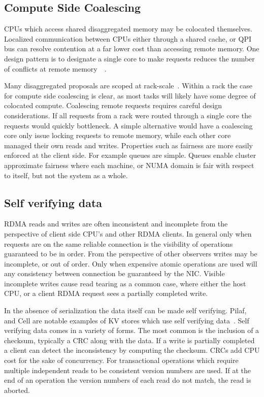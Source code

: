 \subsection{Compute Side Coalescing}
CPUs which access shared disaggregated memory may be colocated themselves.
Localized communication between CPUs either through a shared cache, or QPI bus
can resolve contention at a far lower cost than accessing remote memory.
One design pattern is to designate a single core to make requests reduces the
number of conflicts at remote memory~\cite{flat-combine}~\cite{sherman}. 

Many disaggregated proposals are scoped at rack-scale~\cite{disandapp}. Within a
rack the case for compute side coalescing is clear, as most tasks will likely
have some degree of colocated compute. Coalescing remote requests requires
careful design considerations. If all requests from a rack were routed through a
single core the requests would quickly bottleneck. A simple alternative would
have a coalescing core only issue locking requests to remote memory, while each
other core managed their own reads and writes.  Properties such as fairness are
more easily enforced at the client side. For example queues are simple. Queues
enable cluster approximate fairness where each machine, or NUMA domain is fair
with respect to itself, but not the system as a whole.

\subsection{Self verifying data} 
RDMA reads and writes are often inconsistent and incomplete from the perspective
of client side CPU's and other RDMA clients. In general only when requests are
on the same reliable connection is the visibility of operations guaranteed to be
in order. From the perspective of other observers writes may be incomplete, or
out of order. Only when expensive atomic operations are used will any
consistency between connection be guaranteed by the NIC. Visible incomplete
writes cause read tearing as a common case, where either the host CPU, or a
client RDMA request sees a partially completed write. 

In the absence of serialization the data itself can be made self verifying.
Pilaf, and Cell are notable examples of KV stores which use self verifying
data~\cite{pilaf,cell}. Self verifying data comes in a variety of forms. The
most common is the inclusion of a checksum, typically a CRC along with the data.
If a write is partially completed a client can detect the inconsistency by
computing the checksum. CRCs add CPU cost for the sake of concurrency. For
transactional operations which require multiple independent reads to be
consistent version numbers are used. If at the end of an operation the version
numbers of each read do not match, the read is aborted.


